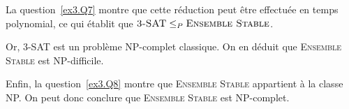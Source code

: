 \begin{exercice}
\begin{corrections}
    La question~\ref{ex3.Q7} montre que cette réduction peut être effectuée en temps polynomial,
    ce qui établit que $\textsc{3-SAT} \leq_P \textsc{Ensemble Stable}$.

    Or, \textsc{3-SAT} est un problème NP-complet classique. On en déduit que \textsc{Ensemble Stable} est NP-difficile.

    Enfin, la question~\ref{ex3.Q8} montre que \textsc{Ensemble Stable} appartient à la classe NP.
    On peut donc conclure que \textsc{Ensemble Stable} est NP-complet.
  \end{corrections}

\end{exercice}

\endgroup
\endinput
